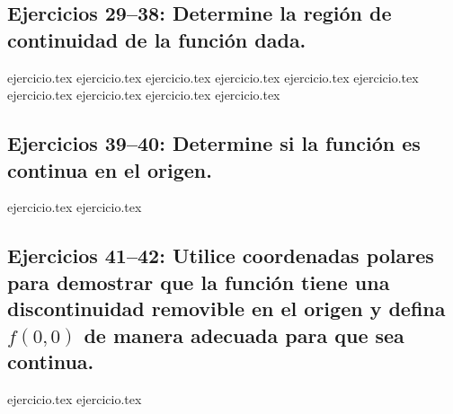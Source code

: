 \subsection*{Ejercicios 29--38: Determine la región de continuidad de la función dada.}
\begin{enumerate}
    \setcounter{enumi}{28}
    {ejercicio.tex}
    {ejercicio.tex}
    {ejercicio.tex}
    {ejercicio.tex}
    {ejercicio.tex}
    {ejercicio.tex}
    {ejercicio.tex}
    {ejercicio.tex}
    {ejercicio.tex}
    {ejercicio.tex}
\end{enumerate}

\subsection*{Ejercicios 39--40: Determine si la función es continua en el origen.}
\begin{enumerate}
    \setcounter{enumi}{38}
    {ejercicio.tex}
    {ejercicio.tex}
\end{enumerate}

\subsection*{Ejercicios 41--42: Utilice coordenadas polares para demostrar que la función tiene una discontinuidad removible en el origen y defina $f(0,0)$ de manera adecuada para que sea continua.}
\begin{enumerate}
    \setcounter{enumi}{40}
    {ejercicio.tex}
    {ejercicio.tex}
\end{enumerate}
